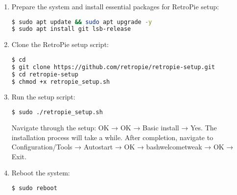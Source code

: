 \begin{enumerate}
\item Prepare the system and install essential packages for RetroPie setup:  
\begin{lstlisting}[language=bash, breaklines=true, breakatwhitespace=true, columns=fullflexible]
$ sudo apt update && sudo apt upgrade -y  
$ sudo apt install git lsb-release
\end{lstlisting}

\item Clone the RetroPie setup script:
\begin{lstlisting}[language=bash, breaklines=true, breakatwhitespace=true, columns=fullflexible]
$ cd
$ git clone https://github.com/retropie/retropie-setup.git
$ cd retropie-setup
$ chmod +x retropie_setup.sh
\end{lstlisting}

\item Run the setup script:
\begin{lstlisting}[language=bash, breaklines=true, breakatwhitespace=true, columns=fullflexible]
$ sudo ./retropie_setup.sh
\end{lstlisting}
Navigate through the setup: OK → OK → Basic install → Yes. The installation process will take a while. After completion, navigate to Configuration/Tools → Autostart → OK → bashwelcometweak → OK → Exit.

\item Reboot the system:
\begin{lstlisting}[language=bash, breaklines=true, breakatwhitespace=true, columns=fullflexible]
$ sudo reboot
\end{lstlisting}


\end{enumerate}
